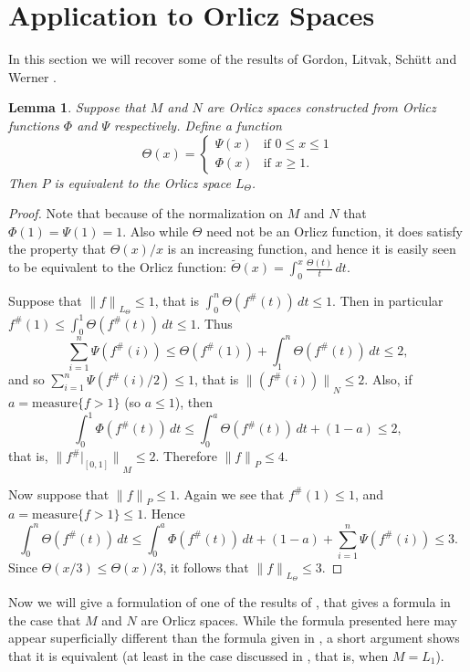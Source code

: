 \documentclass[12pt]{amsart}
\newtheorem{lemma}[thm]{Lemma}
\newcommand{\snormo}[1]{{\mathopen\|#1\mathclose\|}}
\newcommand{\measure}{\text{measure}}
\begin{document}
\section{Application to Orlicz Spaces}

In this section we will recover some of the results of
Gordon, Litvak, Sch\"utt and Werner \cite{gordon et al}.

\begin{lemma}
\label{l equiv}
Suppose that $M$ and $N$ are Orlicz spaces constructed
from Orlicz functions $\Phi$ and $\Psi$ respectively.  
Define a function
\[
   \Theta(x) = \left\{
   \begin{array}{cl}
     \Psi(x) & \text{if }0\le x \le 1\\
     \Phi(x) & \text{if }x \ge 1.
   \end{array} \right.
\]
Then $P$ is equivalent to the Orlicz space $L_\Theta$.
\end{lemma}

\begin{proof}
Note that because of the normalization on $M$ and $N$ that 
$\Phi(1) = \Psi(1) = 1$.  
Also while
$\Theta$ need not be an Orlicz function, 
it does satisfy the property that $\Theta(x)/x$ is an increasing 
function, and hence it is easily seen to
be equivalent
to the Orlicz function:
$\tilde\Theta(x) = \int_0^x \frac{\Theta(t)} t \, dt $.

Suppose that $\snormo f_{L_\Theta} \le 1$, that is
$\int_0^n \Theta(f^\#(t)) \, dt \le 1 $.
Then in particular $f^\#(1) \le \int_0^1 \Theta(f^\#(t)) \, dt \le 1 $.
Thus
\[
   \sum_{i=1}^n \Psi(f^\#(i)) \le \Theta(f^\#(1)) + 
     \int_1^n \Theta(f^\#(t)) \, dt \le 2 ,
\]
and so $\sum_{i=1}^n \Psi(f^\#(i)/2) \le 1$, that is 
$\snormo{(f^\#(i))}_N \le 2$.
Also, if $a = \measure\{f>1\}$ (so $a\le 1$), then
\[
   \int_0^1 \Phi(f^\#(t)) \, dt \le
   \int_0^a \Theta(f^\#(t)) \, dt + (1-a) \le 2,
\]
that is, $\snormo{f^\#|_{[0,1]}}_M \le 2$.  
Therefore $\snormo f_P \le 4$.

Now suppose that $\snormo f_P \le 1$.  
Again we see that $f^\#(1) \le 1$,
and $a = \measure\{f>1\} \le 1$.  
Hence
\[
   \int_0^n \Theta(f^\#(t)) \, dt \le
   \int_0^a \Phi(f^\#(t)) \, dt + (1-a) + 
   \sum_{i=1}^n \Psi(f^\#(i)) \le 3 .
\]
Since $\Theta(x/3) \le \Theta(x)/3$, it follows that
$\snormo f_{L_\Theta} \le 3$.
\end{proof}

Now we will give a formulation of one of the results of
\cite{gordon et al}, that gives a formula in the case that $M$ and
$N$ are Orlicz spaces.  
While the formula presented here may appear
superficially different than the formula given in \cite{gordon et al},
a short argument shows that it is equivalent (at least in
the case discussed in \cite{gordon et al}, that is, when $M = L_1$).
\end{document}
